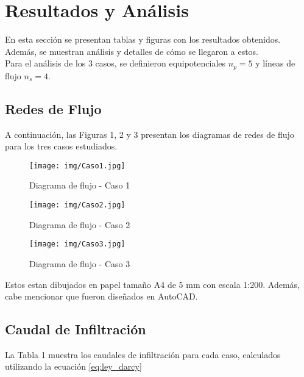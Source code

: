 \documentclass{article} %
\begin{document}
\newpage

\section{Resultados y Análisis}

En esta sección se presentan tablas y figuras con los resultados obtenidos. Además, se muestran análisis y detalles de cómo se llegaron a estos.\\

Para el análisis de los 3 casos, se definieron equipotenciales $n_p = 5$ y líneas de flujo $n_s = 4$.

\subsection{Redes de Flujo}

A continuación, las Figuras 1, 2 y 3 presentan los diagramas de redes de flujo para los tres casos estudiados.

\begin{figure}[h!]
    \centering
    \begin{minipage}{0.3\textwidth}
        \centering
        \texttt{[image: img/Caso1.jpg]}
        \caption{Diagrama de flujo - Caso 1}
        \label{fig:imagen1}
    \end{minipage}\hfill
    \begin{minipage}{0.3\textwidth}
        \centering
        \texttt{[image: img/Caso2.jpg]}
        \caption{Diagrama de flujo - Caso 2}
        \label{fig:imagen2}
    \end{minipage}\hfill
    \begin{minipage}{0.3\textwidth}
        \centering
        \texttt{[image: img/Caso3.jpg]}
        \caption{Diagrama de flujo - Caso 3}
        \label{fig:imagen3}
    \end{minipage}
\end{figure}

Estos estan dibujados en papel tamaño A4 de 5 mm con escala 1:200. Además, cabe mencionar que fueron diseñados en AutoCAD.

\subsection{Caudal de Infiltración}

La Tabla 1 muestra los caudales de infiltración para cada caso, calculados utilizando la ecuación \ref{eq:ley_darcy}
\end{document}
